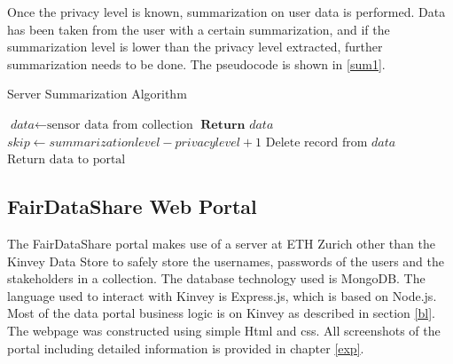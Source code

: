 Once the privacy level is known, summarization on user data is performed. Data has been taken from the user with a certain summarization, and if the summarization level is lower than the privacy level extracted, further summarization needs to be done. The pseudocode is shown in \ref{sum1}.

\begin{algorithm}
\caption{Server Summarization Algorithm}\label{sum1}
\begin{algorithmic}[1]
\State $\textit{data} \gets \text{sensor data from collection}$
	\State $\textbf{Return }\textit{data}$
\Else
	\State $\textit{skip} \gets \textit{summarizationlevel}-\textit{privacylevel}+1$
 	 \State $\text{Delete record from}\textit{ data}$
 	 \EndFor
\EndIf
\State $\text{Return data to portal}$
\EndProcedure
\end{algorithmic}
\end{algorithm}

\subsection{FairDataShare Web Portal}
The FairDataShare portal makes use of a server at ETH Zurich other than the Kinvey Data Store to safely store the usernames, passwords of the users and the stakeholders in a collection. The database technology used is MongoDB. The language used to interact with Kinvey is Express.js, which is based on Node.js. Most of the data portal business logic is on Kinvey as described in section \ref{bl}. The webpage was constructed using simple Html and css. All screenshots of the portal including detailed information is provided in chapter \ref{exp}.









